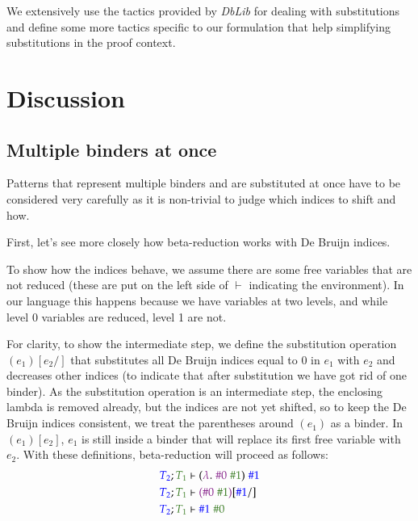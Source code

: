 \documentclass[runningheads]{article}
\begin{document}
We extensively use the tactics provided by \textit{DbLib} for dealing with substitutions and define some more tactics specific to our formulation that help simplifying substitutions in the proof context.
\section{Discussion}
\label{sec:discussion}
\subsection{Multiple binders at once}
\label{multibind}

Patterns that represent multiple binders and are substituted at once have to be considered very carefully as it is non-trivial to judge which indices to shift and how.

First, let's see more closely how beta-reduction works with De Bruijn indices.

To show how the indices behave, we assume there are some free variables that are not reduced (these are put on the left side of $\vdash$ indicating the environment). In our language this happens because we have variables at two levels, and while level 0 variables are reduced, level 1 are not.

For clarity, to show the intermediate step, we define the substitution operation $(e_1)[e_2/]$ that substitutes all De Bruijn indices equal to 0 in $e_1$ with $e_2$ and decreases other indices (to indicate that after substitution we have got rid of one binder). As the substitution operation is an intermediate step, the enclosing lambda is removed already, but the indices are not yet shifted, so to keep the De Bruijn indices consistent, we treat the parentheses around $(e_1)$ as a binder. In $(e_1)[e_2]$, $e_1$ is still inside a binder that will replace its first free variable with $e_2$. With these definitions, beta-reduction will proceed as follows:
\begin{align*}
{\color{blue}T_2}; {\color{OliveGreen}T_1} &\vdash ({\color{Fuchsia}\lambda}. \; {\color{Fuchsia}\#0} \; {\color{OliveGreen}\#1}) \; {\color{blue}\#1} \\
{\color{blue}T_2}; {\color{OliveGreen}T_1} &\vdash {\color{Fuchsia}({\color{Fuchsia}\#0} \; {\color{OliveGreen}\#1})}[{\color{blue}\#1}/] \\
{\color{blue}T_2}; {\color{OliveGreen}T_1} &\vdash {\color{blue}\#1} \; {\color{OliveGreen}\#0}
\end{align*}
\end{document}
